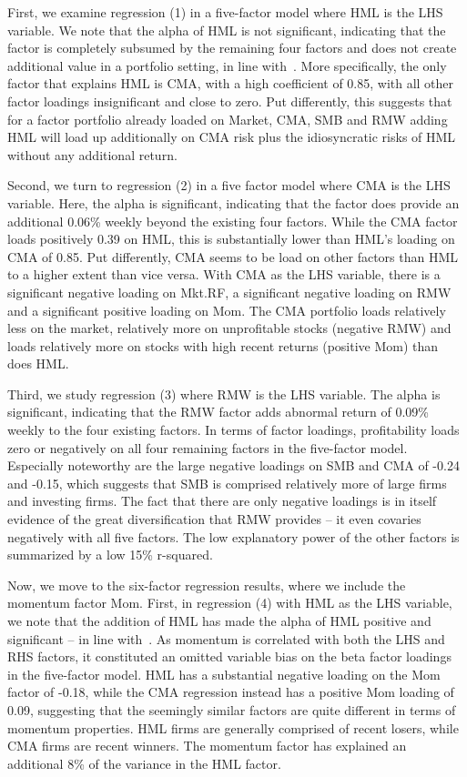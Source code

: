 First, we examine regression (1) in a five-factor model where HML is the LHS variable. We note that the alpha of HML is not significant, indicating that the factor is completely subsumed by the remaining four factors and does not create additional value in a portfolio setting, in line with~\textcite{FF2015}. More specifically, the only factor that explains HML is CMA, with a high coefficient of 0.85, with all other factor loadings insignificant and close to zero. Put differently, this suggests that for a factor portfolio already loaded on Market, CMA, SMB and RMW adding HML will load up additionally on CMA risk plus the idiosyncratic risks of HML without any additional return.

Second, we turn to regression (2) in a five factor model where CMA is the LHS variable. Here, the alpha is significant, indicating that the factor does provide an additional 0.06\% weekly beyond the existing four factors. While the CMA factor loads positively 0.39 on HML, this is substantially lower than HML's loading on CMA of 0.85. Put differently, CMA seems to be load on other factors than HML to a higher extent than vice versa. With CMA as the LHS variable, there is a significant negative loading on Mkt.RF, a significant negative loading on RMW and a significant positive loading on Mom. The CMA portfolio loads relatively less on the market, relatively more on unprofitable stocks (negative RMW) and loads relatively more on stocks with high recent returns (positive Mom) than does HML.

Third, we study regression (3) where RMW is the LHS variable. The alpha is significant, indicating that the RMW factor adds abnormal return of 0.09\% weekly to the four existing factors. In terms of factor loadings, profitability loads zero or negatively on all four remaining factors in the five-factor model. Especially noteworthy are the large negative loadings on SMB and CMA of -0.24 and -0.15, which suggests that SMB is comprised relatively more of large firms and investing firms. The fact that there are only negative loadings is in itself evidence of the great diversification that RMW provides -- it even covaries negatively with all five factors. The low explanatory power of the other factors is summarized by a low 15\% r-squared.



Now, we move to the six-factor regression results, where we include the momentum factor Mom. First, in regression (4) with HML as the LHS variable, we note that the addition of HML has made the alpha of HML positive and significant -- in line with~\textcite{Asness2015}. As momentum is correlated with both the LHS and RHS factors, it constituted an omitted variable bias on the beta factor loadings in the five-factor model. HML has a substantial negative loading on the Mom factor of -0.18, while the CMA regression instead has a positive Mom loading of 0.09, suggesting that the seemingly similar factors are quite different in terms of momentum properties. HML firms are generally comprised of recent losers, while CMA firms are recent winners. The momentum factor has explained an additional 8\% of the variance in the HML factor.

